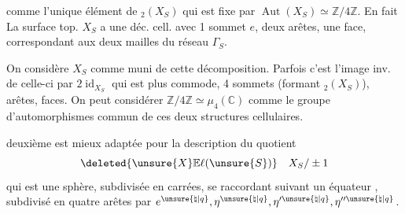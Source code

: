 
comme l'unique élément de \({}_2(X_S)\) qui est fixe par $\operatorname{Aut}(X_S)\simeq\mathbb Z/4\mathbb Z$. En fait
\inserted{\[
(X_S)^{i}\overset{\mathrm{def}}{=}\{x\in X_S\deleted{\}} \mid ix=x\}=\{e,\eta_S\}
\]}
 La surface top. $X_S$ a une déc. cell.  avec 1 sommet $e$, deux arêtes, une face,  correspondant aux deux mailles du réseau $\Gamma_S$.

On considère $X_S$ comme muni de cette décomposition. Parfois c'est l'image inv. de celle-ci par $2\operatorname{id}_{X_S}$ qui est plus commode, 4 sommets (formant \({}_2(X_S)\)),   arêtes,   faces. On peut considérer $\mathbb Z/4\mathbb Z\simeq\mu_4(\mathbb C)$ comme le groupe d'automorphismes commun de ces deux structures cellulaires.


 deuxième est mieux adaptée pour la description du quotient
\[
\deleted{\unsure{X}\mathbb E\ell(\unsure{S})}\quad X_S/\pm1
\]
qui est une sphère, subdivisée en   carrées, se raccordant suivant un équateur , subdivisé en quatre arêtes par $e^{\unsure{\natural|q}},\eta^{\unsure{\natural|q}},\eta'^{\unsure{\natural|q}},\eta''^{\unsure{\natural|q}}$.

